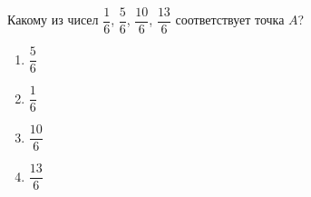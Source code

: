  
\begin{ex}
	Какому из чисел $\dfrac{1}{6}$, $\dfrac{5}{6}$, $\dfrac{10}{6}$, $\dfrac{13}{6}$ соответствует точка $A$?
	
	\selectanswer
	\begin{multicols}{4}
		\begin{enumerate}[label=\arabic*)]
			\item $\dfrac{5}{6}$
			\item $\dfrac{1}{6}$
			\item $\dfrac{10}{6}$
			\item $\dfrac{13}{6}$
		\end{enumerate}
	\end{multicols}
\end{ex}